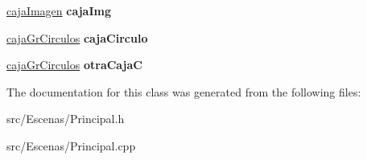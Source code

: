 \begin{DoxyCompactItemize}
\item 
\hypertarget{class_principal_a03f3c45162ef82d132a5f907dfc5324a}{}\hyperlink{classcaja_imagen}{caja\+Imagen} {\bfseries caja\+Img}\label{class_principal_a03f3c45162ef82d132a5f907dfc5324a}

\item 
\hypertarget{class_principal_a99a502ec7cf76b4d693e402296c2e8ed}{}\hyperlink{classcaja_gr_circulos}{caja\+Gr\+Circulos} {\bfseries caja\+Circulo}\label{class_principal_a99a502ec7cf76b4d693e402296c2e8ed}

\item 
\hypertarget{class_principal_a1cb34111059b2ac3d00f7e91e672a51b}{}\hyperlink{classcaja_gr_circulos}{caja\+Gr\+Circulos} {\bfseries otra\+Caja\+C}\label{class_principal_a1cb34111059b2ac3d00f7e91e672a51b}

\end{DoxyCompactItemize}


The documentation for this class was generated from the following files\+:\begin{DoxyCompactItemize}
\item 
src/\+Escenas/Principal.\+h\item 
src/\+Escenas/Principal.\+cpp\end{DoxyCompactItemize}
